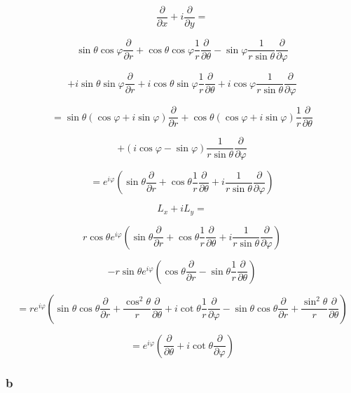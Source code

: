 \documentclass[12pt]{article}
\begin{document}
\[
    \frac{\partial}{\partial x} + i \frac{\partial}{\partial y} =
\]

\[
    \sin{\theta} \cos{\varphi} \frac{\partial}{\partial r}
    + \cos{\theta} \cos{\varphi} \frac{1}{r} \frac{\partial}{\partial \theta}
    - \sin{\varphi} \frac{1}{r \sin{\theta}} \frac{\partial}{\partial \varphi}
\]

\[
    + i  \sin{\theta} \sin{\varphi} \frac{\partial}{\partial r}
    + i \cos{\theta} \sin{\varphi} \frac{1}{r} \frac{\partial}{\partial \theta}
    + i \cos{\varphi} \frac{1}{r \sin{\theta}} \frac{\partial}{\partial \varphi}
\]

\[
    = \sin{\theta} \left(\cos{\varphi} + i \sin{\varphi}\right) \frac{\partial}{\partial r}
    + \cos{\theta} \left(\cos{\varphi} + i \sin{\varphi}\right) \frac{1}{r} \frac{\partial}{\partial \theta}
\]

\[
    + \left(i \cos{\varphi} - \sin{\varphi}\right)  \frac{1}{r \sin{\theta}} \frac{\partial}{\partial \varphi}
\]

\[
    = e^{i \varphi}
    \left(
    \sin{\theta} \frac{\partial}{\partial r}+ \cos{\theta} \frac{1}{r} \frac{\partial}{\partial \theta}
    + i \frac{1}{r \sin{\theta}} \frac{\partial}{\partial \varphi}
    \right)
\]

\[
    L_x + i L_y =
\]

\[
    r \cos{\theta} e^{i \varphi}
    \left(
    \sin{\theta} \frac{\partial}{\partial r}
    + \cos{\theta} \frac{1}{r} \frac{\partial}{\partial \theta}
    + i \frac{1}{r \sin{\theta}} \frac{\partial}{\partial \varphi}
    \right)
\]

\[
    - r \sin{\theta} e^{i \varphi}
    \left(
    \cos{\theta} \frac{\partial}{\partial r} - \sin{\theta} \frac{1}{r} \frac{\partial}{\partial \theta}
    \right)
\]

\[
    = r e^{i \varphi}
    \left(
    \sin{\theta} \cos{\theta} \frac{\partial}{\partial r}
    + \frac{\cos^2{\theta}}{r} \frac{\partial}{\partial \theta}
    + i \cot{\theta} \frac{1}{r}\frac{\partial}{\partial \varphi}
    - \sin{\theta} \cos{\theta} \frac{\partial}{\partial r}
    + \frac{\sin^2{\theta}}{r} \frac{\partial}{\partial \theta}
    \right)
\]

\[
    = e^{i \varphi}
    \left(
    \frac{\partial}{\partial \theta}
    + i \cot{\theta}\frac{\partial}{\partial \varphi}
    \right)
\]

\subsubsection{b}
\end{document}
